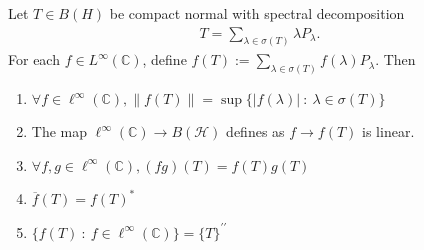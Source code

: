 \begin{theorem}
  Let $T \in B(H)$ be compact normal with spectral decomposition
  \begin{align*}
    T = \sum_{\lambda \in  \sigma(T)} \lambda P_\lambda.
  \end{align*}
  For each $f \in L^\infty(\mathbb{C})$, define $f(T) := \sum_{ \lambda \in
  \sigma(T)}  f(\lambda)   P_\lambda$. Then
  \begin{enumerate}[label=(\arabic*)]
    \item $\forall f \in \ell^\infty(\mathbb{C}), \|f(T)\| = \sup \{
      |f(\lambda)|  \ : \  \lambda \in \sigma(T) \}$
    \item The map $\ell^\infty(\mathbb{C}) \to B(\mathcal{H})$
      defines as $f \to f(T)$ is linear.
    \item $\forall f, g \in \ell^\infty(\mathbb{C}), (fg)(T) = f(T)g(T)$
    \item $\overline{f}(T) = f(T)^*$
    \item $ \{ f(T)  \ : \   f \in \ell^\infty(\mathbb{C}) \} = \{ T
      \}^{\prime \prime}$
  \end{enumerate}
\end{theorem}
